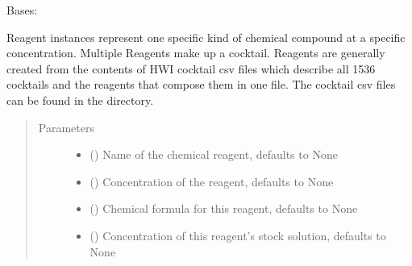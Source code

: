 \documentclass[letterpaper,10pt,english]{sphinxmanual}
\begin{document}
\begin{fulllineitems}
\label{\detokenize{polo.crystallography:polo.crystallography.cocktail.Reagent}}
Bases: 

Reagent instances represent one specific kind of chemical compound at
a specific concentration. Multiple Reagents make up a cocktail. Reagents
are generally created from the contents of HWI cocktail csv files which
describe all 1536 cocktails and the reagents that compose them in one file.
The cocktail csv files can be found in the  directory.
\begin{quote}\begin{description}
\item[{Parameters}] \leavevmode\begin{itemize}
\item {} 
 (\sphinxstyleliteralemphasis{\sphinxupquote{, }}) \textendash{} Name of the chemical reagent,
defaults to None

\item {} 
 ({\hyperref[\detokenize{polo.crystallography:polo.crystallography.cocktail.UnitValue}]{}}\sphinxstyleliteralemphasis{\sphinxupquote{, }}) \textendash{} Concentration of the reagent,
defaults to None

\item {} 
 (\sphinxstyleliteralemphasis{\sphinxupquote{, }}) \textendash{} Chemical formula for this reagent, defaults
to None

\item {} 
 ({\hyperref[\detokenize{polo.crystallography:polo.crystallography.cocktail.UnitValue}]{}}\sphinxstyleliteralemphasis{\sphinxupquote{, }}) \textendash{} Concentration of this reagent’s stock solution,
defaults to None


\end{itemize}
\end{description}
\end{quote}
\end{fulllineitems}
\end{document}
